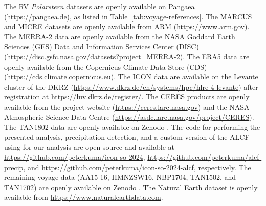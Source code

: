 \documentclass[draft]{agujournal2019}
\begin{document}
The RV \emph{Polarstern} datasets are openly available on Pangaea (\url{https://pangaea.de}), as listed in Table~\ref{tab:voyage-references}. The MARCUS and MICRE datasets are openly available from ARM (\url{https://www.arm.gov}). The MERRA-2 data are openly available from the NASA Goddard Earth Sciences (GES) Data and Information Services Center (DISC) (\url{https://disc.gsfc.nasa.gov/datasets?project=MERRA-2}). The ERA5 data are openly available from the Copernicus Climate Data Store (CDS) (\url{https://cds.climate.copernicus.eu}). The ICON data are available on the Levante cluster of the DKRZ (\url{https://www.dkrz.de/en/systems/hpc/hlre-4-levante}) after registration at \url{https://luv.dkrz.de/register/}. The CERES products are openly available from the project website (\url{https://ceres.larc.nasa.gov}) and the NASA Atmospheric Science Data Centre (\url{https://asdc.larc.nasa.gov/project/CERES}). The TAN1802 data are openly available on Zenodo \cite{kremser2020}. The code for performing the presented analysis, precipitation detection, and a custom version of the ALCF using for our analysis are open-source and available at \url{https://github.com/peterkuma/icon-so-2024}, \url{https://github.com/peterkuma/alcf-precip}, and \url{https://github.com/peterkuma/icon-so-2024-alcf}, respectively. The remaining voyage data (AA15-16, HMNZSW16, NBP1704, TAN1502, and TAN1702) are openly available on Zenodo \cite{mcdonald2024b}. The Natural Earth dataset is openly available from \url{https://www.naturalearthdata.com}.

\acknowledgments
\end{document}
